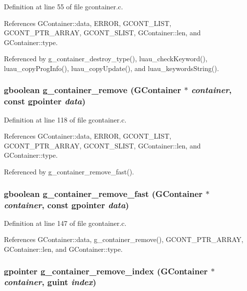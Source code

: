 Definition at line 55 of file gcontainer.c.

References GContainer::data, ERROR, GCONT\_\-LIST, GCONT\_\-PTR\_\-ARRAY, GCONT\_\-SLIST, GContainer::len, and GContainer::type.

Referenced by g\_\-container\_\-destroy\_\-type(), luau\_\-check\-Keyword(), luau\_\-copy\-Prog\-Info(), luau\_\-copy\-Update(), and luau\_\-keywords\-String().
\subsubsection{\setlength{\rightskip}{0pt plus 5cm}gboolean g\_\-container\_\-remove ({\bf GContainer} $\ast$ {\em container}, const gpointer {\em data})}\label{gcontainer_8h_a8}




Definition at line 118 of file gcontainer.c.

References GContainer::data, ERROR, GCONT\_\-LIST, GCONT\_\-PTR\_\-ARRAY, GCONT\_\-SLIST, GContainer::len, and GContainer::type.

Referenced by g\_\-container\_\-remove\_\-fast().
\subsubsection{\setlength{\rightskip}{0pt plus 5cm}gboolean g\_\-container\_\-remove\_\-fast ({\bf GContainer} $\ast$ {\em container}, const gpointer {\em data})}\label{gcontainer_8h_a9}




Definition at line 147 of file gcontainer.c.

References GContainer::data, g\_\-container\_\-remove(), GCONT\_\-PTR\_\-ARRAY, GContainer::len, and GContainer::type.
\subsubsection{\setlength{\rightskip}{0pt plus 5cm}gpointer g\_\-container\_\-remove\_\-index ({\bf GContainer} $\ast$ {\em container}, guint {\em index})}\label{gcontainer_8h_a10}





